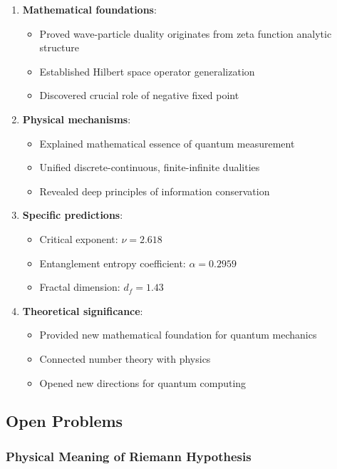 \documentclass[11pt]{article}
\theoremstyle{plain}
\theoremstyle{definition}
\theoremstyle{remark}
\begin{document}
\begin{enumerate}
\item \textbf{Mathematical foundations}:
   \begin{itemize}
   \item Proved wave-particle duality originates from zeta function analytic structure
   \item Established Hilbert space operator generalization
   \item Discovered crucial role of negative fixed point
   \end{itemize}

\item \textbf{Physical mechanisms}:
   \begin{itemize}
   \item Explained mathematical essence of quantum measurement
   \item Unified discrete-continuous, finite-infinite dualities
   \item Revealed deep principles of information conservation
   \end{itemize}

\item \textbf{Specific predictions}:
   \begin{itemize}
   \item Critical exponent: $\nu = 2.618$
   \item Entanglement entropy coefficient: $\alpha = 0.2959$
   \item Fractal dimension: $d_f = 1.43$
   \end{itemize}

\item \textbf{Theoretical significance}:
   \begin{itemize}
   \item Provided new mathematical foundation for quantum mechanics
   \item Connected number theory with physics
   \item Opened new directions for quantum computing
   \end{itemize}
\end{enumerate}

\subsection{Open Problems}

\subsubsection{Physical Meaning of Riemann Hypothesis}
\end{document}

